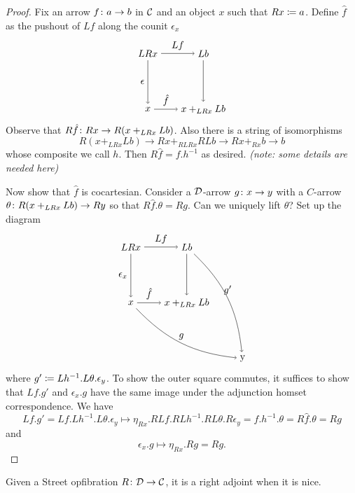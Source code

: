 \documentclass{amsart}
\begin{document}
\begin{proof}
	Fix an arrow $ f \colon a \to b $ in $ \mathcal{C} $ and an object $ x $ such that $ Rx \coloneqq a $.  Define $ \hat{f} $ as the pushout of $ Lf $ along the counit $ \epsilon_x $
	\[
	\begin{tikzpicture}
		\node (ul) at (0,2) {$ LRx $};
		\node (ll) at (0,0) {$ x $};
		\node (ur) at (2,2) {$ Lb $};
		\node (lr) at (2,0) {$ x +_{LRx} Lb$};
		\draw [->] (ul) to node [left] {$ \epsilon $} (ll);
		\draw [->] (ul) to node [above] {$ Lf $} (ur);
		\draw [->] (ll) to node [above] {$ \hat{f} $} (lr);
		\draw [->] (ur) to (lr);
	\end{tikzpicture}
	\] 
	Observe that $ R \hat{f} \colon Rx \to R( x +_{LRx} Lb ) $. Also there is a string of isomorphisms  
	\[
		R( x +_{LRx} Lb ) \to Rx +_{RLRx} RLb \to Rx +_{Rx} b \to b
	\]
	whose composite we call $ h $. Then $ R \hat{f} = f . h^{-1} $ as desired.  \emph{(note: some details are needed here)}
	
	Now show that $ \hat{f} $ is cocartesian.  Consider a $ \mathcal{D} $-arrow $ g \colon x \to y $ with a $ C $-arrow $ \theta \colon R( x +_{LRx} Lb ) \to Ry  $ so that $ R \hat{f} . \theta = Rg $.  Can we uniquely lift $ \theta $? Set up the diagram
	\[
	\begin{tikzpicture}
		\node (ul) at (0,2) {$ LRx $};
		\node (ll) at (0,0) {$ x $};
		\node (ur) at (2,2) {$ Lb $};
		\node (lr) at (2,0) {$ x +_{LRx} Lb$};
		\node (comp) at (4,-2) {y};
		\draw [->] (ul) to node [left] {$ \epsilon_x $} (ll);
		\draw [->] (ul) to node [above] {$ Lf $} (ur);
		\draw [->] (ll) to node [above] {$ \hat{f} $} (lr);
		\draw [->] (ur) to (lr);
		\draw [->] (ll) to [bend right=20] node [above] {$ g $} (comp);
		\draw [->] (ur) to [bend left=20] node [above] {$ g' $} (comp);
	\end{tikzpicture}
	\] 
	where $ g' \coloneqq Lh^{-1} . L\theta.\epsilon_y $.  To show the outer square commutes, it suffices to show that $ Lf . g' $ and $ \epsilon_x . g $ have the same image under the adjunction homset correspondence.  We have
	\[
		Lf . g' = Lf . Lh^{-1} . L\theta.\epsilon_y 
			\mapsto \eta_{Rx} . RLf . RLh^{-1} . RL\theta.R\epsilon_y 
			= f . h^{-1} . \theta  
			= R \hat{f} . \theta 
			= Rg
	\]
	and 
	\[
	\epsilon_x . g \mapsto \eta_{Rx} . Rg = Rg.	
	\]
\end{proof}



\begin{thm}
	Given a Street opfibration $ R \colon \mathcal{D} \to \mathcal{C} $, it is a right adjoint when it is nice.
\end{thm}
 
\end{document}
